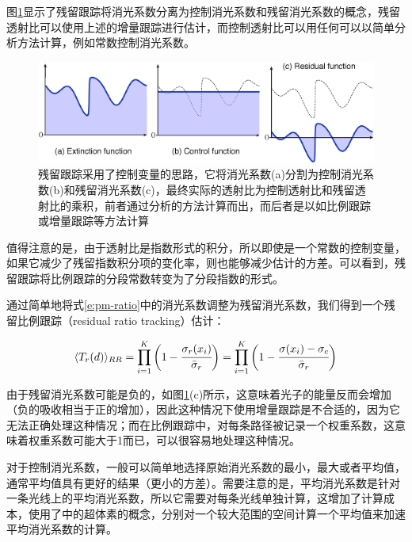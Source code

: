 图\ref{f:pm-residual}显示了残留跟踪将消光系数分离为控制消光系数和残留消光系数的概念，残留透射比可以使用上述的增量跟踪进行估计，而控制透射比可以用任何可以以简单分析方法计算，例如常数控制消光系数。

\begin{figure}
	\includegraphics[width=1.0\textwidth]{figures/pm/residual}
	\caption{残留跟踪采用了控制变量的思路，它将消光系数(a)分割为控制消光系数(b)和残留消光系数(c)，最终实际的透射比为控制透射比和残留透射比的乘积，前者通过分析的方法计算而出，而后者是以如比例跟踪或增量跟踪等方法计算}
	\label{f:pm-residual}
\end{figure}

值得注意的是，由于透射比是指数形式的积分，所以即使是一个常数的控制变量，如果它减少了残留指数积分项的变化率，则也能够减少估计的方差。可以看到，残留跟踪将比例跟踪的分段常数转变为了分段指数的形式。

通过简单地将式\ref{e:pm-ratio}中的消光系数调整为残留消光系数，我们得到一个残留比例跟踪（residual ratio tracking）估计：

\begin{equation}
	\langle T_r(d)\rangle_{RR}=\prod^{K}_{i=1}\bigg(1- \cfrac{\sigma_r(x_i)}{\bar{\sigma}_r}\bigg)=\prod^{K}_{i=1}\bigg(1- \cfrac{\sigma(x_i)-\sigma_c}{\bar{\sigma}_r}\bigg)
\end{equation}

由于残留消光系数可能是负的，如图\ref{f:pm-residual}(c)所示，这意味着光子的能量反而会增加（负的吸收相当于正的增加），因此这种情况下使用增量跟踪是不合适的，因为它无法正确处理这种情况；而在比例跟踪中，对每条路径被记录一个权重系数，这意味着权重系数可能大于1而已，可以很容易地处理这种情况。

对于控制消光系数，一般可以简单地选择原始消光系数的最小，最大或者平均值，通常平均值具有更好的结果（更小的方差）。需要注意的是，平均消光系数是针对一条光线上的平均消光系数，所以它需要对每条光线单独计算，这增加了计算成本，\cite{a:ResidualRatioTrackingforEstimatingAttenuationinParticipatingMedia}使用了\cite{a:FreePathSamplinginHighResolutionInhomogeneousParticipatingMedia}中的超体素的概念，分别对一个较大范围的空间计算一个平均值来加速平均消光系数的计算。

